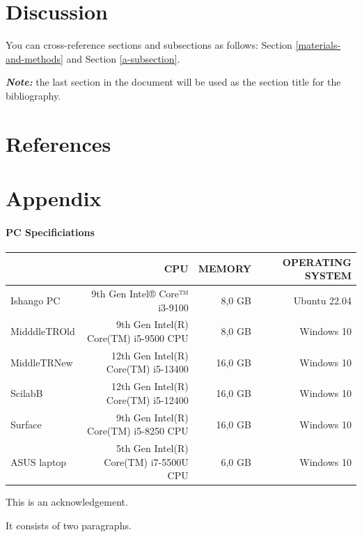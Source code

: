 \documentclass[12pt,halfline,a4paper,]{ouparticle}
\begin{document}
\section{Discussion}\label{discussion}

You can cross-reference sections and subsections as follows: Section
\ref{materials-and-methods} and Section \ref{a-subsection}.

\textbf{\emph{Note:}} the last section in the document will be used as
the section title for the bibliography.

\section{References}\label{references}

\section{Appendix}\label{appendix}

\paragraph{PC Specificiations}\label{pc-specificiations}

\hfill\break

\begin{tabular}{l|r|r|r}
\hline
  & CPU & MEMORY & OPERATING SYSTEM\\
\hline
Ishango PC &  9th Gen Intel® Core™ i3-9100  & 8,0 GB &  Ubuntu 22.04\\
\hline
MidddleTROld & 9th Gen Intel(R) Core(TM) i5-9500 CPU & 8,0 GB &  Windows 10\\
\hline
MiddleTRNew & 12th Gen Intel(R) Core(TM) i5-13400 & 16,0 GB &  Windows 10\\
\hline
ScilabB &  12th Gen Intel(R) Core(TM) i5-12400 &  16,0 GB  &  Windows 10\\
\hline
Surface &  9th Gen Intel(R) Core(TM) i5-8250 CPU &  16,0 GB  &  Windows 10\\
\hline
ASUS laptop &  5th Gen Intel(R) Core(TM) i7-5500U CPU &  6,0 GB  &  Windows 10\\
\end{tabular}

\hfill\break


\begin{notes}[Acknowledgements]
This is an acknowledgement.

It consists of two paragraphs.
\end{notes}
\end{document}
